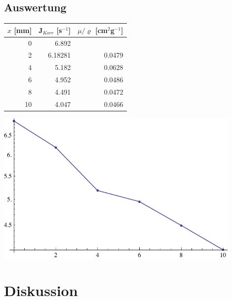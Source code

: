 \documentclass[12pt,a4paper]{article}
\begin{document}
\subsection*{Auswertung}
\begin{tabular}{|r|r|r|}
\hline
$x$ [mm]&J$_{Korr}$ [s$^{-1}$]&$\mu /\varrho $ [cm${}^2$g${}^{-1}$]\\
\hline
0&6.892&\\
2&6.18281&0.0479\\
4&5.182&0.0628\\
6&4.952&0.0486\\
8&4.491&0.0472\\
10&4.047&0.0466\\
\hline
\end{tabular}
\begin{center}
\includegraphics[width=12cm]{diagram4.pdf}
\end{center}

\section*{Diskussion}
\end{document}
